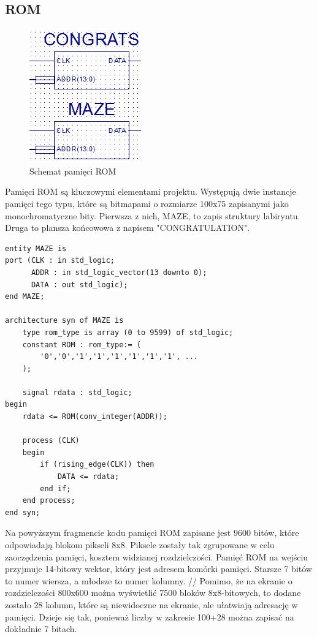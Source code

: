 \documentclass[11pt]{article}
\begin{document}
\subsection{ROM}

\begin{figure}[h!]
\center
\includegraphics[scale=1]{ROM.png} 
\caption{Schemat pamięci ROM}
\end{figure}

Pamięci ROM są kluczowymi elementami projektu. Występują dwie instancje pamięci tego typu, które są bitmapami o rozmiarze 100x75 zapisanymi jako monochromatyczne bity.
Pierwsza z nich, MAZE, to zapis struktury labiryntu.
Druga to plansza końcowowa z napisem "CONGRATULATION".

\begin{lstlisting}
entity MAZE is
port (CLK : in std_logic;
      ADDR : in std_logic_vector(13 downto 0);
      DATA : out std_logic);
end MAZE;

architecture syn of MAZE is
    type rom_type is array (0 to 9599) of std_logic;
    constant ROM : rom_type:= (
        '0','0','1','1','1','1','1','1', ...
    );

    signal rdata : std_logic;
begin
    rdata <= ROM(conv_integer(ADDR));

    process (CLK)
    begin
        if (rising_edge(CLK)) then
            DATA <= rdata;
        end if;
    end process;
end syn;
\end{lstlisting}

Na powyższym fragmencie kodu pamięci ROM zapisane jest 9600 bitów, które odpowiadają blokom pikseli 8x8.
Piksele zostały tak zgrupowane w celu zaoczędzenia pamięci, kosztem widzianej rozdzielczości.
Pamięć ROM na wejściu przyjmuje 14-bitowy wektor, który jest adresem komórki pamięci.
Starsze 7 bitów to numer wiersza, a młodsze to numer kolumny.
//
Pomimo, że na ekranie o rozdzielczości 800x600 można wyświetlić 7500 bloków 8x8-bitowych, to dodane zostało 28 kolumn, które są niewidoczne na ekranie, ale ułatwiają adresację w pamięci.
Dzieje się tak, ponieważ liczby w zakresie 100+28 można zapisać na dokładnie 7 bitach.
\end{document}
